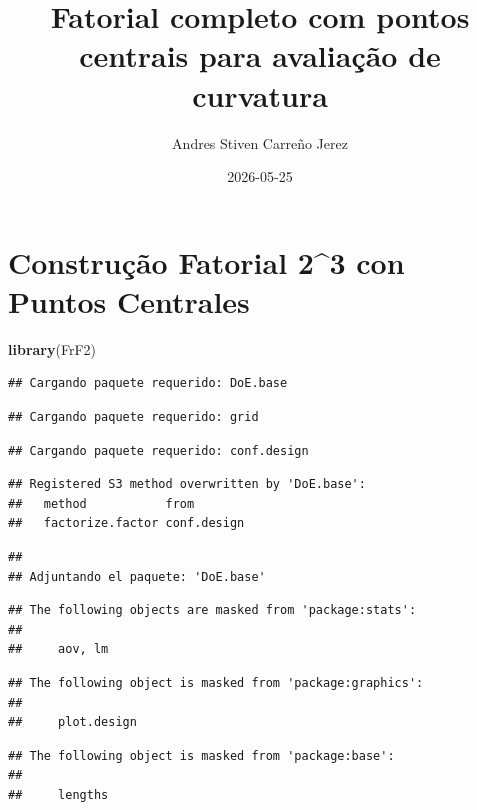 \documentclass[
]{article}
\title{Fatorial completo com pontos centrais para avaliação de
curvatura}
\author{Andres Stiven Carreño Jerez}
\date{2026-05-25}
\newenvironment{Shaded}{\begin{snugshade}}{\end{snugshade}}
\newcommand{\FunctionTok}[1]{\textcolor[rgb]{0.13,0.29,0.53}{\textbf{#1}}}
\newcommand{\NormalTok}[1]{#1}
\begin{document}
\maketitle

\section{Construção Fatorial 2\^{}3 con Puntos
Centrales}\label{construuxe7uxe3o-fatorial-23-con-puntos-centrales}

\begin{Shaded}
\begin{Highlighting}[]
\FunctionTok{library}\NormalTok{(FrF2)}
\end{Highlighting}
\end{Shaded}

\begin{verbatim}
## Cargando paquete requerido: DoE.base
\end{verbatim}

\begin{verbatim}
## Cargando paquete requerido: grid
\end{verbatim}

\begin{verbatim}
## Cargando paquete requerido: conf.design
\end{verbatim}

\begin{verbatim}
## Registered S3 method overwritten by 'DoE.base':
##   method           from       
##   factorize.factor conf.design
\end{verbatim}

\begin{verbatim}
## 
## Adjuntando el paquete: 'DoE.base'
\end{verbatim}

\begin{verbatim}
## The following objects are masked from 'package:stats':
## 
##     aov, lm
\end{verbatim}

\begin{verbatim}
## The following object is masked from 'package:graphics':
## 
##     plot.design
\end{verbatim}

\begin{verbatim}
## The following object is masked from 'package:base':
## 
##     lengths
\end{verbatim}
\end{document}
